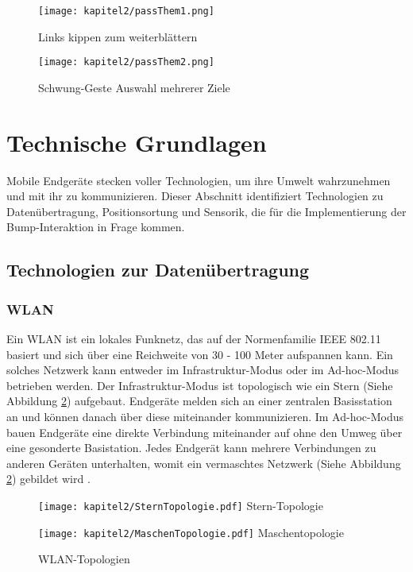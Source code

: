 \begin{figure}[H]
\begin{minipage}[h]{7cm}
	\centering
	\texttt{[image: kapitel2/passThem1.png]}
	\caption{Links kippen zum weiterblättern \cite{Lucero:2011:PCU:1978942.1979201}}
	\label{fig:passtThem1}
\end{minipage}
\hfill
\begin{minipage}[h]{7cm}
	\centering
	\texttt{[image: kapitel2/passThem2.png]}
	\caption{Schwung-Geste Auswahl mehrerer Ziele \cite{Lucero:2011:PCU:1978942.1979201}}
	\label{fig:beamTransfer}
\end{minipage}
\end{figure}

\newpage
\section{Technische Grundlagen}
Mobile Endgeräte stecken voller Technologien, um ihre Umwelt wahrzunehmen und mit ihr zu kommunizieren. Dieser Abschnitt identifiziert Technologien zu Datenübertragung, Positionsortung und Sensorik, die für die Implementierung der Bump-Interaktion in Frage kommen.

\subsection{Technologien zur Datenübertragung}

\subsubsection{WLAN}
Ein \ac{WLAN} ist ein lokales Funknetz, das auf der Normenfamilie \acs{IEEE} 802.11 basiert und sich über eine Reichweite von 30 - 100 Meter aufspannen kann. Ein solches Netzwerk kann entweder im Infrastruktur-Modus oder im Ad-hoc-Modus betrieben werden. Der Infrastruktur-Modus ist topologisch wie ein Stern (Siehe Abbildung \ref{fig:topo}) aufgebaut. Endgeräte melden sich an einer zentralen Basisstation an und können danach über diese miteinander kommunizieren. Im Ad-hoc-Modus bauen Endgeräte eine direkte Verbindung miteinander auf ohne den Umweg über eine gesonderte Basistation. Jedes Endgerät kann mehrere Verbindungen zu anderen Geräten unterhalten, womit ein vermaschtes Netzwerk (Siehe Abbildung \ref{fig:topo}) gebildet wird \cite[46-55]{baun2012computernetze}.  

\begin{figure}[H]
\begin{minipage}[h]{7cm}
  \centering
  \texttt{[image: kapitel2/SternTopologie.pdf]}
  Stern-Topologie
\end{minipage}
\hfill
\begin{minipage}[h]{7cm}
  \centering
  \texttt{[image: kapitel2/MaschenTopologie.pdf]}
  Maschentopologie
\end{minipage}
  \caption{WLAN-Topologien \cite[vgl. Abb. 3.1]{baun2012computernetze}}
    \label{fig:topo}
\end{figure}

